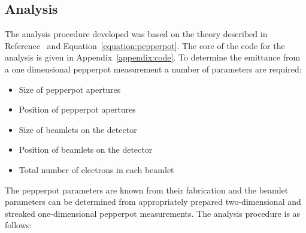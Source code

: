 \subsection{Analysis}
The analysis procedure developed was based on the theory described in Reference~\cite{zhang_emittance_1996} and Equation~\ref{equation:pepperpot}.
The core of the code for the analysis is given in Appendix~\ref{appendix:code}.
To determine the emittance from a one dimensional pepperpot measurement a number of parameters are required:
\begin{itemize}
    \item Size of pepperpot apertures
    \item Position of pepperpot apertures
    \item Size of beamlets on the detector
    \item Position of beamlets on the detector
    \item Total number of electrons in each beamlet
\end{itemize}
The pepperpot parameters are known from their fabrication and the beamlet parameters can be determined from appropriately prepared two-dimensional and streaked one-dimensional pepperpot measurements.
The analysis procedure is as follows:
